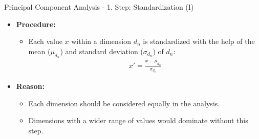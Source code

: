 \begin{frame}{Principal Component Analysis - 1. Step: Standardization (I)}
	\begin{itemize}
		\item \textbf{Procedure:}
		      \begin{itemize}
			      \item Each value $x$ within a dimension $d_n$ is standardized with
			            the help of the mean ($\mu_{d_n}$) and standard deviation
			            ($\sigma_{d_n}$) of $d_n$:
			            \begin{align*}
				            x' = \frac{x - \mu_{d_n}}{\sigma_{d_n}}
			            \end{align*}
		      \end{itemize}
		\item \textbf{Reason:}
		      \begin{itemize}
			      \item Each dimension should be considered equally in the analysis.
			      \item Dimensions with a wider range of	values would dominate
			            without this step.
		      \end{itemize}
	\end{itemize}
\end{frame}


